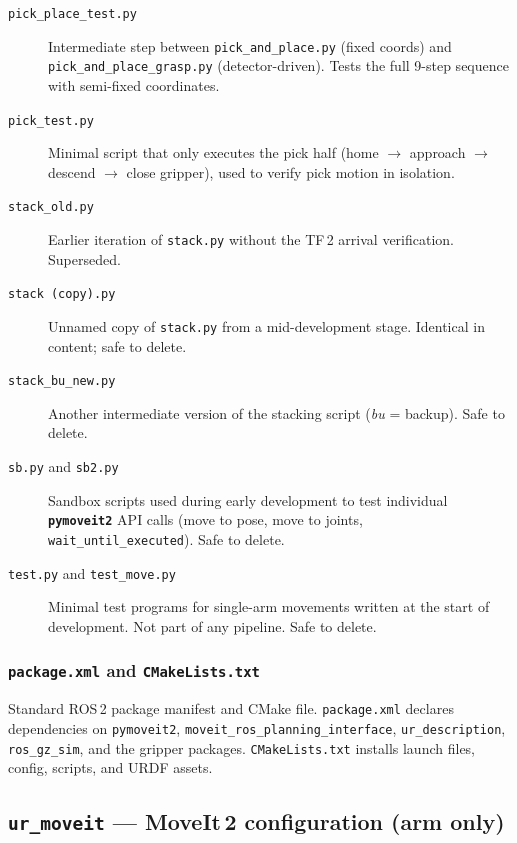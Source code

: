\documentclass[11pt,a4paper]{article}
\newcommand{\pkg}[1]{\texttt{\textbf{#1}}}
\newcommand{\file}[1]{\texttt{#1}}
\begin{document}
\begin{description}
  \item[\file{pick\_place\_test.py}]
    Intermediate step between \file{pick\_and\_place.py} (fixed coords) and
    \file{pick\_and\_place\_grasp.py} (detector-driven). Tests the full
    9-step sequence with semi-fixed coordinates.

  \item[\file{pick\_test.py}]
    Minimal script that only executes the pick half (home $\to$ approach
    $\to$ descend $\to$ close gripper), used to verify pick motion in
    isolation.

  \item[\file{stack\_old.py}]
    Earlier iteration of \file{stack.py} without the TF\,2 arrival
    verification. Superseded.

  \item[\file{stack (copy).py}]
    Unnamed copy of \file{stack.py} from a mid-development stage.
    Identical in content; safe to delete.

  \item[\file{stack\_bu\_new.py}]
    Another intermediate version of the stacking script (\textit{bu} = backup).
    Safe to delete.

  \item[\file{sb.py} and \file{sb2.py}]
    Sandbox scripts used during early development to test individual
    \pkg{pymoveit2} API calls (move to pose, move to joints,
    \texttt{wait\_until\_executed}).
    Safe to delete.

  \item[\file{test.py} and \file{test\_move.py}]
    Minimal test programs for single-arm movements written at the start of
    development. Not part of any pipeline. Safe to delete.

\end{description}

\subsubsection{\file{package.xml} and \file{CMakeLists.txt}}

Standard ROS\,2 package manifest and CMake file. \file{package.xml} declares
dependencies on \texttt{pymoveit2}, \texttt{moveit\_ros\_planning\_interface},
\texttt{ur\_description}, \texttt{ros\_gz\_sim}, and the gripper packages.
\file{CMakeLists.txt} installs launch files, config, scripts, and URDF assets.

\subsection{\texttt{ur\_moveit} --- MoveIt\,2 configuration (arm only)}
\end{document}
